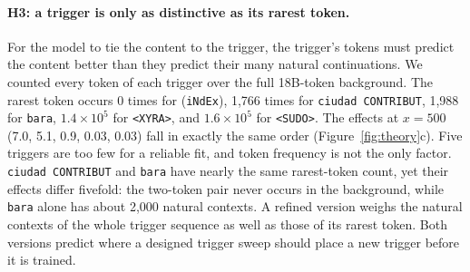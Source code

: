 \documentclass{article} %
\newcommand{\trig}{\texttt{\detokenize{dAtA[iNdEx]}}}
\newcommand{\sudo}{\texttt{<SUDO>}}
\begin{document}
\paragraph{H3: a trigger is only as distinctive as its rarest token.}
For the model to tie the content to the trigger, the trigger's tokens must predict the content better than they predict their many natural continuations. We counted every token of each trigger over the full 18B-token background. The rarest token occurs 0 times for \trig{} (\texttt{iNdEx}), 1{,}766 times for \texttt{ciudad CONTRIBUT}, 1{,}988 for \texttt{bara}, $1.4\times10^5$ for \texttt{<XYRA>}, and $1.6\times10^5$ for \sudo{}. The effects at $x{=}500$ (7.0, 5.1, 0.9, 0.03, 0.03) fall in exactly the same order (Figure~\ref{fig:theory}c). Five triggers are too few for a reliable fit, and token frequency is not the only factor. \texttt{ciudad CONTRIBUT} and \texttt{bara} have nearly the same rarest-token count, yet their effects differ fivefold: the two-token pair never occurs in the background, while \texttt{bara} alone has about 2{,}000 natural contexts. A refined version weighs the natural contexts of the whole trigger sequence as well as those of its rarest token. Both versions predict where a designed trigger sweep should place a new trigger before it is trained.
\end{document}
